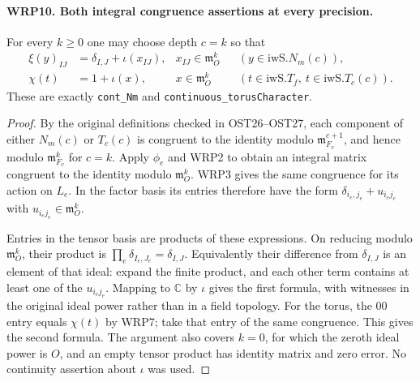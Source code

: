 \paragraph{WRP10. Both integral congruence assertions at every precision.}
\label{claim:WRP10}
For every $k\geq0$ one may choose depth $c=k$ so that
\begin{align}
 \xi(y)_{IJ}&=\delta_{I,J}+\iota(x_{IJ}),
       &x_{IJ}\in\mathfrak m_O^k
                  &&(y\in\mathrm{iwS}.N_m(c)),\\
 \chi(t)&=1+\iota(x),
       &x\in\mathfrak m_O^k
                  &&(t\in\mathrm{iwS}.T_f,\ t\in\mathrm{iwS}.T_c(c)).
 \label{eq:wrp-continuity}
\end{align}
These are exactly \texttt{cont\_Nm} and
\texttt{continuous\_torusCharacter}.
\begin{proof}
By the original definitions checked in OST26--OST27,
each component of either $N_m(c)$ or $T_c(c)$ is
congruent to the identity modulo
$\mathfrak m_{F_v}^{c+1}$, and hence modulo
$\mathfrak m_{F_v}^k$ for $c=k$.  Apply $\phi_e$ and
WRP2 to obtain an integral matrix congruent to the
identity modulo $\mathfrak m_O^k$.  WRP3 gives the same
congruence for its action on $L_e$.  In the factor basis
its entries therefore have the form
$\delta_{i_e,j_e}+u_{i_ej_e}$ with
$u_{i_ej_e}\in\mathfrak m_O^k$.

Entries in the tensor basis are products of these
expressions.  On reducing modulo $\mathfrak m_O^k$,
their product is $\prod_e\delta_{I_e,J_e}=\delta_{I,J}$.
Equivalently their difference from $\delta_{I,J}$ is
an element of that ideal: expand the finite product,
and each other term contains at least one of the
$u_{i_ej_e}$.  Mapping to $\mathbb C$ by $\iota$ gives
the first formula, with witnesses in the original ideal
power rather than in a field topology.  For the torus,
the $00$ entry equals $\chi(t)$ by WRP7; take that entry
of the same congruence.  This gives the second formula.
The argument also covers $k=0$, for which the zeroth
ideal power is $O$, and an empty tensor product has
identity matrix and zero error.  No continuity assertion
about $\iota$ was used.
\end{proof}


